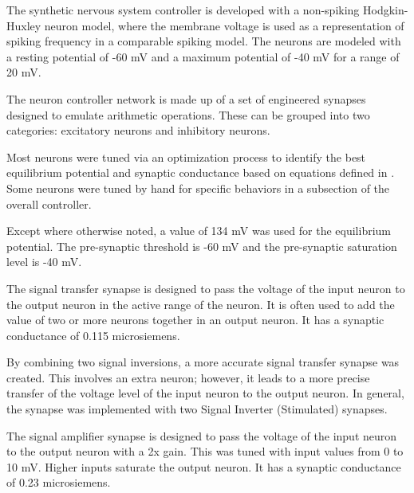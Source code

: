 The synthetic nervous system controller is developed with a non-spiking Hodgkin-Huxley neuron model, where the membrane voltage is used as a representation of spiking frequency in a comparable spiking model. The neurons are modeled with a resting potential of -60 mV and a maximum potential of -40 mV for a range of 20 mV.



The neuron controller network is made up of a set of engineered synapses
designed to emulate arithmetic operations. These can be grouped into two
categories: excitatory neurons and inhibitory neurons. 

Most neurons were tuned
via an optimization process to identify the best equilibrium potential and
synaptic conductance based on equations defined in 
\cite{NickFunctionalSubnetwork}. 
Some neurons were tuned by hand for specific behaviors in
a subsection of the overall controller.


Except where otherwise noted, a value of 134 mV was used for the equilibrium
potential. The pre-synaptic threshold is -60 mV and the pre-synaptic saturation
level is -40 mV.


The signal transfer synapse is designed to pass the voltage of the input neuron
to the output neuron in the active range of the neuron. It is often used to add
the value of two or more neurons together in an output neuron.
It has a synaptic 
conductance of 0.115 microsiemens. 


By combining two signal inversions, a more accurate signal transfer synapse was
created. This involves an extra neuron; however, it leads to a more precise
transfer of the voltage level of the input neuron to the output neuron. In
general, the synapse was implemented with two Signal Inverter (Stimulated)
synapses.


The signal amplifier synapse is designed to pass the voltage of the input neuron
to the output neuron with a 2x gain. This was tuned with input values from 0 to
10 mV. Higher inputs saturate the output neuron. It has a synaptic conductance
of 0.23 microsiemens.


